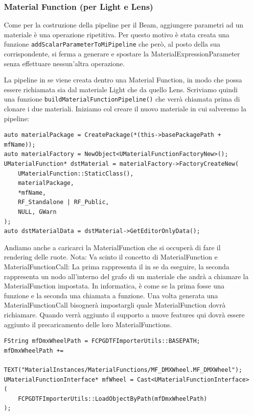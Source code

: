\documentclass[main.tex]{subfiles}
\begin{document}
\subsubsection{Material Function (per Light e Lens)}\label{subsec:2_3_MF}
Come per la costruzione della pipeline per il Beam, aggiungere parametri ad un materiale è una operazione ripetitiva. Per questo motivo è stata creata una funzione \lstinline{addScalarParameterToMiPipeline} che però, al posto della sua corrispondente, si ferma a generare e spostare la MaterialExpressionParameter senza effettuare nessun'altra operazione. \newline

La pipeline in se viene creata dentro una Material Function, in modo che possa essere richiamata sia dal materiale Light che da quello Lens. Scriviamo quindi una funzione \lstinline{buildMaterialFunctionPipeline()} che verrà chiamata prima di clonare i due materiali. Iniziamo col creare il nuovo materiale in cui salveremo la pipeline:
\lstset{language=UEcpp}
\begin{lstlisting}
auto materialPackage = CreatePackage(*(this->basePackagePath + mfName));
auto materialFactory = NewObject<UMaterialFunctionFactoryNew>();
UMaterialFunction* dstMaterial = materialFactory->FactoryCreateNew(
    UMaterialFunction::StaticClass(),
    materialPackage,
    *mfName,
    RF_Standalone | RF_Public,
    NULL, GWarn
);
auto dstMaterialData = dstMaterial->GetEditorOnlyData();
\end{lstlisting}
Andiamo anche a caricarci la MaterialFunction che si occuperà di fare il rendering delle ruote. Nota: Va scinto il concetto di MaterialFunction e MaterialFunctionCall: La prima rappresenta il  in se da eseguire, la seconda rappresenta un nodo all'interno del grafo di un materiale che andrà a chiamare la MaterialFunction impostata. In informatica, è come se la prima fosse una funzione e la seconda una chiamata a funzione. Una volta generata una MaterialFunctionCall bisognerà impostargli quale MaterialFunction dovrà richiamare.
Quando verrà aggiunto il supporto a nuove features qui dovrà essere aggiunto il precaricamento delle loro MaterialFunctions.
\begin{lstlisting}
FString mfDmxWheelPath = FCPGDTFImporterUtils::BASEPATH;
mfDmxWheelPath +=
    TEXT("MaterialInstances/MaterialFunctions/MF_DMXWheel.MF_DMXWheel");
UMaterialFunctionInterface* mfWheel = Cast<UMaterialFunctionInterface>(
    FCPGDTFImporterUtils::LoadObjectByPath(mfDmxWheelPath)
);
\end{lstlisting}
\end{document}
